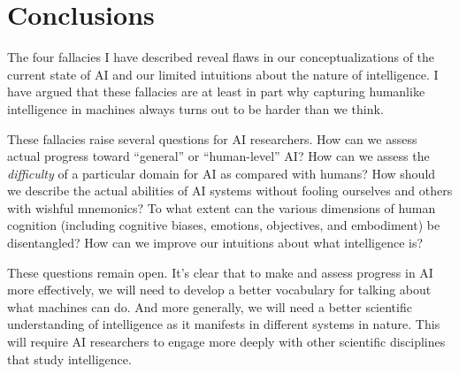 \documentclass{article}
\begin{document}
\section*{Conclusions}

The four fallacies I have described reveal flaws in our conceptualizations of the current state of AI and our limited intuitions about the nature of intelligence.  I have argued that these fallacies are at least in part why capturing humanlike intelligence in machines always turns out to be harder than we think.

These fallacies raise several questions for AI researchers. How can we assess actual progress toward ``general'' or ``human-level'' AI?  How can we assess the \textit{difficulty} of a particular domain for AI as compared with humans?  How should we describe the actual abilities of AI systems without fooling ourselves and others with wishful mnemonics?  To what extent can the various dimensions of human cognition (including cognitive biases, emotions, objectives, and embodiment) be disentangled?  How can we improve our intuitions about what intelligence is?

These questions remain open.  It's clear that to make and assess progress in AI more effectively, we will need to develop a better vocabulary for talking about what machines can do.  And more generally, we will need a better scientific understanding of intelligence as it manifests in different systems in nature.  This will require AI researchers to engage more deeply with other scientific disciplines that study intelligence.  
\end{document}
